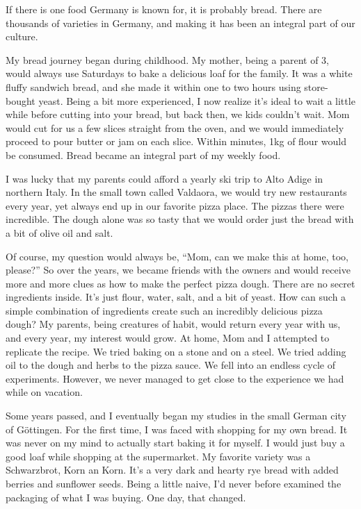 If there is one food Germany is known for, it is probably bread.
There are thousands of varieties in Germany,
and making it has been an integral part of our culture.

My bread journey began during childhood. My mother, being a parent
of 3, would always use Saturdays to bake a delicious loaf for the family.
It was a white fluffy sandwich bread, and she made it within one to two hours using store-bought yeast.
Being a bit more experienced, I now realize it's
ideal to wait a little while before cutting into your bread, but back then,
we kids couldn't wait. Mom would cut for us a few slices straight from the oven, and we would
immediately proceed to pour butter or jam on each slice. Within minutes, 1kg of
flour would be consumed. Bread became an integral part of my weekly food.

I was lucky that my parents could afford a yearly ski trip to
Alto Adige in northern Italy. In the small town called Valdaora, we
would try new restaurants every year, yet always end up in our favorite
pizza place. The pizzas there were incredible. The dough
alone was so tasty that we would order just the bread with a
bit of olive oil and salt.

Of course, my question would always be, ``Mom, can we make this at home, too, please?''
So over the years, we became friends with the owners and would receive
more and more clues as how to make the perfect pizza dough. There
are no secret ingredients inside. It's just flour, water, salt, and a bit of yeast.
How can such a simple combination of ingredients create such an incredibly delicious
pizza dough? My parents, being creatures of habit, would return every year with us,
and every year, my interest would grow. At home, Mom and I attempted to replicate
the recipe. We tried baking on a stone and on a steel. We tried adding oil to the dough and herbs
to the pizza sauce. We fell into an endless cycle of experiments. However, we never managed
to get close to the experience we had while on vacation.

Some years passed, and I eventually began my studies in the small German city of Göttingen.
For the first time, I was faced with shopping for my own bread. It was never
on my mind to actually start baking it for myself. I would just buy 
a good loaf while shopping at the supermarket. My favorite variety
was a Schwarzbrot, Korn an Korn. It’s a very dark and hearty rye bread
with added berries and sunflower seeds. Being a little naive,
I'd never before examined the packaging of what I was buying. One day, that
changed.

